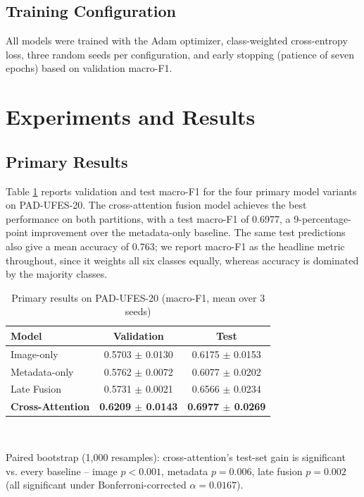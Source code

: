 \documentclass[conference]{IEEEtran}
\begin{document}
\subsection{Training Configuration}
All models were trained with the Adam optimizer, class-weighted cross-entropy loss, three random seeds per configuration, and early stopping (patience of seven epochs) based on validation macro-F1.

\section{Experiments and Results}

\subsection{Primary Results}
Table \ref{tab:primary} reports validation and test macro-F1 for the four primary model variants on PAD-UFES-20. The cross-attention fusion model achieves the best performance on both partitions, with a test macro-F1 of 0.6977, a 9-percentage-point improvement over the metadata-only baseline. The same test predictions also give a mean accuracy of 0.763; we report macro-F1 as the headline metric throughout, since it weights all six classes equally, whereas accuracy is dominated by the majority classes.

\begin{table}[t]
\caption{Primary results on PAD-UFES-20 (macro-F1, mean over 3 seeds)}
\label{tab:primary}
\centering
\begin{tabular}{|l|c|c|}
\hline
\textbf{Model} & \textbf{Validation} & \textbf{Test} \\
\hline
Image-only & 0.5703 $\pm$ 0.0130 & 0.6175 $\pm$ 0.0153 \\
\hline
Metadata-only & 0.5762 $\pm$ 0.0072 & 0.6077 $\pm$ 0.0202 \\
\hline
Late Fusion & 0.5731 $\pm$ 0.0021 & 0.6566 $\pm$ 0.0234 \\
\hline
\textbf{Cross-Attention} & \textbf{0.6209 $\pm$ 0.0143} & \textbf{0.6977 $\pm$ 0.0269} \\
\hline
\end{tabular}
\\[2pt]
\raggedright{\scriptsize Paired bootstrap (1,000 resamples): cross-attention's test-set gain is significant vs. every baseline -- image $p<0.001$, metadata $p=0.006$, late fusion $p=0.002$ (all significant under Bonferroni-corrected $\alpha=0.0167$).}
\end{table}
\end{document}
